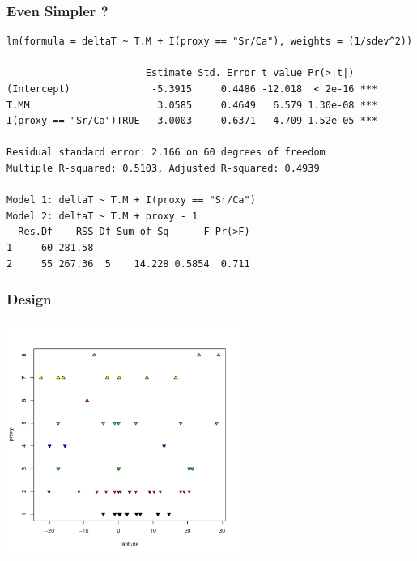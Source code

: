 \documentclass[handout]{beamer}
\begin{document}
\begin{frame}[fragile]
  \frametitle{Even Simpler ?}
  \begin{small}
\begin{verbatim}
lm(formula = deltaT ~ T.M + I(proxy == "Sr/Ca"), weights = (1/sdev^2))

                        Estimate Std. Error t value Pr(>|t|)
(Intercept)              -5.3915     0.4486 -12.018  < 2e-16 ***
T.MM                      3.0585     0.4649   6.579 1.30e-08 ***
I(proxy == "Sr/Ca")TRUE  -3.0003     0.6371  -4.709 1.52e-05 ***

Residual standard error: 2.166 on 60 degrees of freedom
Multiple R-squared: 0.5103,	Adjusted R-squared: 0.4939

Model 1: deltaT ~ T.M + I(proxy == "Sr/Ca")
Model 2: deltaT ~ T.M + proxy - 1
  Res.Df    RSS Df Sum of Sq      F Pr(>F)
1     60 281.58
2     55 267.36  5    14.228 0.5854  0.711
\end{verbatim}
\end{small}
\end{frame}

\begin{frame}
  \frametitle{Design}
  \centerline{\includegraphics[height=3in]{lat-proxy}}
\end{frame}
\end{document}
